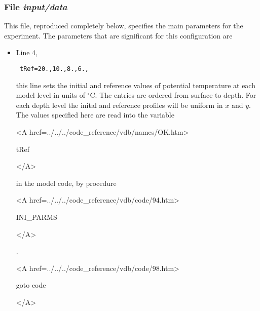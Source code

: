 \subsubsection{File {\it input/data}}

This file, reproduced completely below, specifies the main parameters 
for the experiment. The parameters that are significant for this configuration
are

\begin{itemize}

\item Line 4, 
\begin{verbatim} tRef=20.,10.,8.,6., \end{verbatim} 
this line sets
the initial and reference values of potential temperature at each model
level in units of $^{\circ}$C.
The entries are ordered from surface to depth. For each
depth level the inital and reference profiles will be uniform in
$x$ and $y$. The values specified here are read into the
variable 
{\bf
\begin{rawhtml} <A href=../../../code_reference/vdb/names/OK.htm> \end{rawhtml}
tRef
\begin{rawhtml} </A>\end{rawhtml}
} 
in the model code, by procedure 
{\it
\begin{rawhtml} <A href=../../../code_reference/vdb/code/94.htm> \end{rawhtml}
INI\_PARMS
\begin{rawhtml} </A>\end{rawhtml}
}.

\newcommand{\VARtref}{
{\bf
\begin{rawhtml} <A href=../../../code_reference/vdb/names/OK.htm> \end{rawhtml}
tRef
\begin{rawhtml} </A>\end{rawhtml}
} 
}



{\bf
\begin{rawhtml} <A href=../../../code_reference/vdb/code/98.htm> \end{rawhtml}
goto code
\begin{rawhtml} </A>\end{rawhtml}
}



\end{itemize}
